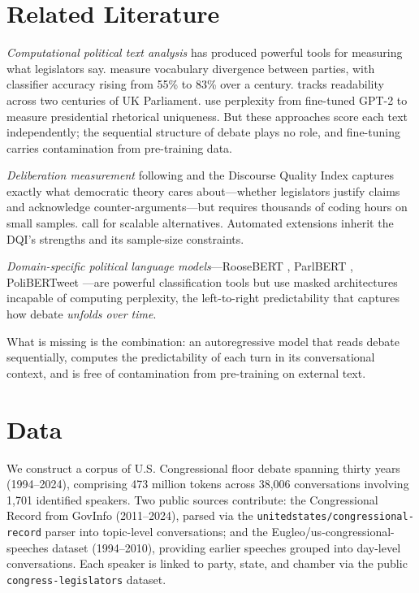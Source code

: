 \documentclass[12pt]{article}
\begin{document}
\section{Related Literature}

\textit{Computational political text analysis} has produced powerful tools for measuring what legislators say. \citet{gentzkow2019} measure vocabulary divergence between parties, with classifier accuracy rising from 55\% to 83\% over a century. \citet{spirling2016} tracks readability across two centuries of UK Parliament. \citet{zhou2024} use perplexity from fine-tuned GPT-2 to measure presidential rhetorical uniqueness. But these approaches score each text independently; the sequential structure of debate plays no role, and fine-tuning carries contamination from pre-training data.

\textit{Deliberation measurement} following \citet{steiner2004} and the Discourse Quality Index captures exactly what democratic theory cares about---whether legislators justify claims and acknowledge counter-arguments---but requires thousands of coding hours on small samples. \citet{bachtiger2019} call for scalable alternatives. Automated extensions \citep{fournierTombs2021, flores2024} inherit the DQI's strengths and its sample-size constraints.

\textit{Domain-specific political language models}---RooseBERT \citep{evrard2025}, ParlBERT \citep{klamm2022}, PoliBERTweet \citep{kawintiranon2022}---are powerful classification tools but use masked architectures incapable of computing perplexity, the left-to-right predictability that captures how debate \textit{unfolds over time}.

What is missing is the combination: an autoregressive model that reads debate sequentially, computes the predictability of each turn in its conversational context, and is free of contamination from pre-training on external text.


\section{Data}

We construct a corpus of U.S. Congressional floor debate spanning thirty years (1994--2024), comprising 473 million tokens across 38,006 conversations involving 1,701 identified speakers. Two public sources contribute: the Congressional Record from GovInfo \citep{govinfo} (2011--2024), parsed via the \texttt{unitedstates/\allowbreak{}congressional-record} parser \citep{unitedstates_parser} into topic-level conversations; and the Eugleo/\allowbreak{}us-congressional-speeches dataset \citep{eugleo2023} (1994--2010), providing earlier speeches grouped into day-level conversations. Each speaker is linked to party, state, and chamber via the public \texttt{congress-legislators} dataset.
\end{document}
